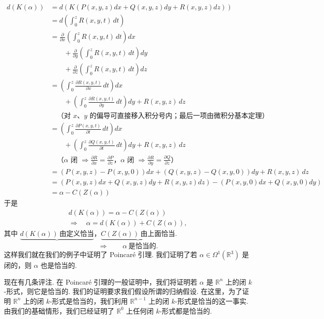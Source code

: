 \[
\begin{aligned}
d(K(\alpha)) &= d\left(K\left(P(x,y,z)dx+Q(x,y,z)dy+R(x,y,z)dz\right)\right)\\
&= d\left(\int_0^z R(x,y,t)\,dt\right)\\
&= \frac{\partial}{\partial x}\left(\int_0^z R(x,y,t)\,dt\right)dx\\
&\qquad+\frac{\partial}{\partial y}\left(\int_0^z R(x,y,t)\,dt\right)dy\\
&\qquad+\frac{\partial}{\partial z}\left(\int_0^z R(x,y,t)\,dt\right)dz\\
&= \left(\int_0^z\frac{\partial R(x,y,t)}{\partial x}\,dt\right)dx\\
&\qquad+\left(\int_0^z\frac{\partial R(x,y,t)}{\partial y}\,dt\right)dy+R(x,y,z)\,dz\\
&\quad\text{（对 }x\text{、}y\text{ 的偏导可直接移入积分号内；最后一项由微积分基本定理）}\\
&= \left(\int_0^z\frac{\partial P(x,y,t)}{\partial t}\,dt\right)dx\\
&\qquad+\left(\int_0^z\frac{\partial Q(x,y,t)}{\partial t}\,dt\right)dy+R(x,y,z)\,dz\\
&\quad\text{（}\alpha\text{ 闭 }\Rightarrow\tfrac{\partial R}{\partial x}=\tfrac{\partial P}{\partial z}\text{，}\alpha\text{ 闭 }\Rightarrow\tfrac{\partial R}{\partial y}=\tfrac{\partial Q}{\partial z}\text{）}\\
&= \left(P(x,y,z)-P(x,y,0)\right)dx+\left(Q(x,y,z)-Q(x,y,0)\right)dy+R(x,y,z)\,dz\\
&= \left(P(x,y,z)dx+Q(x,y,z)dy+R(x,y,z)dz\right)-\left(P(x,y,0)dx+Q(x,y,0)dy\right)\\
&= \alpha-C(Z(\alpha))
\end{aligned}
\]
于是
\begin{align*}
d(K(\alpha))=\alpha-C(Z(\alpha)) \\
\Rightarrow\quad \alpha=d(K(\alpha))+C(Z(\alpha)),
\end{align*}
其中 $\underbrace{d(K(\alpha))\ \text{由定义恰当}}_{}$，$\underbrace{C(Z(\alpha))\ \text{由上面恰当}}_{}$.
\[
\Rightarrow\qquad \alpha\ \text{是恰当的}.
\]
这样我们就在我们的例子中证明了 Poincaré 引理. 我们证明了若 $\alpha\in\Omega^1(\mathbb{R}^3)$ 是闭的，则 $\alpha$ 也是恰当的.

现在有几条评注. 在 Poincaré 引理的一般证明中，我们将证明若 $\alpha$ 是 $\mathbb{R}^n$ 上的闭 $k$-形式，则它是恰当的. 我们的证明要求我们假设所谓的归纳假设. 在这里，为了证明 $\mathbb{R}^n$ 上的闭 $k$-形式是恰当的，我们利用 $\mathbb{R}^{n-1}$ 上的闭 $k$-形式是恰当的这一事实. 由我们的基础情形，我们已经证明了 $\mathbb{R}^0$ 上任何闭 $k$-形式都是恰当的.

